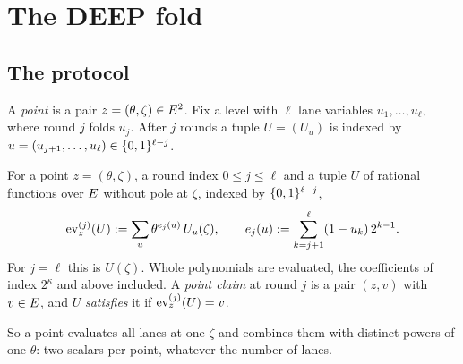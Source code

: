 \section{The DEEP fold}\label{sec:deepfold}

\subsection{The protocol}\label{sec:protocol}

A \emph{point} is a pair $z=(\theta,\zeta)\in E^2$. Fix a level with $\ell$ lane variables $u_1,\dots,u_\ell$, where round $j$ folds $u_j$. After $j$ rounds a tuple $U=(U_u)$ is indexed by $u=(u_{j+1},\dots,u_\ell)\in\{0,1\}^{\ell-j}$.

\begin{definition}\label{def:ev}
For a point $z=(\theta,\zeta)$, a round index $0\le j\le\ell$ and a tuple $U$ of rational functions over $E$ without pole at $\zeta$, indexed by $\{0,1\}^{\ell-j}$,
\[
\operatorname{ev}^{(j)}_z(U):=\sum_{u}\theta^{e_j(u)}\,U_u(\zeta),\qquad e_j(u):=\sum_{k=j+1}^{\ell}(1-u_k)\,2^{k-1}.
\]
For $j=\ell$ this is $U(\zeta)$. Whole polynomials are evaluated, the coefficients of index $2^\kappa$ and above included. A \emph{point claim} at round $j$ is a pair $(z,v)$ with $v\in E$, and $U$ \emph{satisfies} it if $\operatorname{ev}^{(j)}_z(U)=v$.
\end{definition}

So a point evaluates all lanes at one $\zeta$ and combines them with distinct powers of one $\theta$: two scalars per point, whatever the number of lanes.

